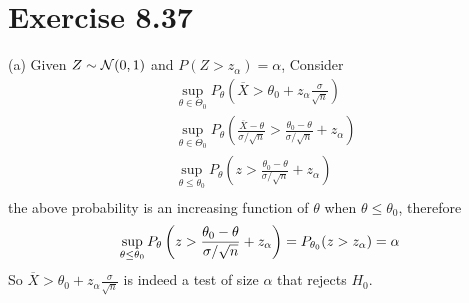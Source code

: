 \documentclass[12pt]{article}
\begin{document}
\section*{Exercise 8.37}
(a) 
Given $Z \sim \mathcal{N}(0, 1)$ and $P(Z > z_\alpha) = \alpha$,  Consider \begin{align*}
	&\sup_{\theta \in \Theta_0} P_{\theta}\left( \overline{X} > \theta_0 + z_{\alpha}\frac{\sigma}{ \sqrt{n}} \right) \\
	&\sup_{\theta \in \Theta_0} P_{\theta}\left( \frac{\overline{X} - \theta}{\sigma / \sqrt{n}} > \frac{\theta_0 - \theta}{\sigma / \sqrt{n}} + z_{\alpha} \right) \\
	&\sup_{\theta \leq \theta_0} P_{\theta}\left( z > \frac{\theta_0 - \theta}{\sigma / \sqrt{n}} + z_{\alpha} \right) \\
\end{align*}
the above probability is an increasing function of $\theta$ when $\theta \leq \theta_0$, therefore
$$
 \sup_{\theta \leq \theta_0} P_{\theta}\left( z > \frac{\theta_0 - \theta}{\sigma / \sqrt{n}} + z_{\alpha} \right) = P_{\theta_0}(z > z_\alpha) = \alpha \\
$$
So $ \overline{X} > \theta_0 + z_{\alpha}\frac{\sigma}{ \sqrt{n}} $ is indeed a test of size $\alpha$ that rejects $H_0$.  \QED
\end{document}
